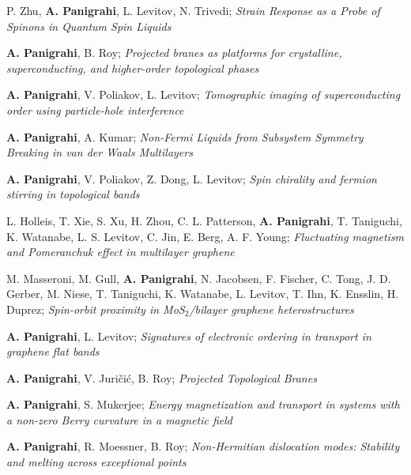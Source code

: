 \begin{cventries}
{\begin{cvitems}
	  	\item{P. Zhu, \textbf{A. Panigrahi}, L. Levitov, N. Trivedi; \textit{Strain Response as a Probe of Spinons in Quantum Spin Liquids} }
	  	\item{\textbf{A. Panigrahi}, B. Roy; \textit{Projected branes as platforms for crystalline, superconducting, and higher-order topological phases} }
	  	\item{\textbf{A. Panigrahi}, V. Poliakov, L. Levitov; \textit{Tomographic imaging of superconducting order using particle-hole interference} }
	  	\item{\textbf{A. Panigrahi}, A. Kumar; \textit{Non-Fermi Liquids from Subsystem Symmetry Breaking in van der Waals Multilayers} }
	  	\item{\textbf{A. Panigrahi}, V. Poliakov, Z. Dong, L. Levitov; \textit{Spin chirality and fermion stirring in topological bands}
	  		}
	  	\item{L. Holleis, T. Xie, S. Xu, H. Zhou, C. L. Patterson, \textbf{A. Panigrahi}, T. Taniguchi, K. Watanabe, L. S. Levitov, C. Jin, E. Berg, A. F. Young; \textit{Fluctuating magnetism and Pomeranchuk effect in multilayer graphene}
	  	}
	  	\item{M. Masseroni, M. Gull, \textbf{A. Panigrahi}, N. Jacobsen, F. Fischer, C. Tong, J. D. Gerber, M. Niese, T. Taniguchi, K. Watanabe, L. Levitov, T. Ihn, K. Ensslin, H. Duprez; \textit{Spin-orbit proximity in MoS$_2$/bilayer graphene heterostructures}
	  		}
	  	\item{\textbf{A. Panigrahi}, L. Levitov; \textit{Signatures of electronic ordering in transport in graphene flat bands} }
	  	\item{\textbf{A. Panigrahi}, V. Juri\v{c}i\'c, B. Roy; \textit{Projected Topological Branes}}
	  	\item{\textbf{A. Panigrahi}, S. Mukerjee; \textit{Energy magnetization and transport in systems with a non-zero Berry curvature in a magnetic field}
	  		}
      	\item{\textbf{A. Panigrahi}, R. Moessner, B. Roy; \textit{Non-Hermitian dislocation modes: Stability and melting across exceptional points} }
      \end{cvitems}
    }


\end{cventries}
